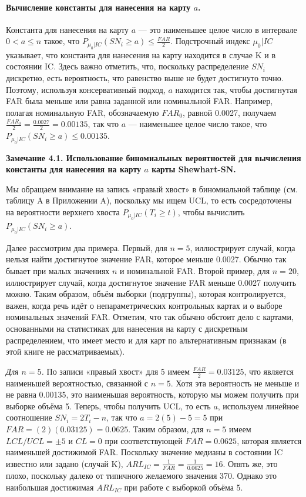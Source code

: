 \paragraph{Вычисление константы для нанесения на карту \(a\).} Константа для нанесения на карту \(a\) --- это наименьшее целое число в интервале \(0 < a \le n\) такое, что \(P_{\mu_0 | IC}(SN_i \ge a) \le \frac{FAR}{2}\). Подстрочный индекс \(\mu_0 | IC\) указывает, что константа для нанесения на карту находится в случае K и в состоянии IC. Здесь важно отметить, что, поскольку распределение \(SN_i\) дискретно, есть вероятность, что равенство выше не будет достигнуто точно. Поэтому, используя консервативный подход, \(a\) находится так, чтобы достигнутая FAR была меньше или равна заданной или номинальной FAR. Например, полагая номинальную FAR, обозначаемую \(FAR_0\), равной 0.0027, получаем \(\frac{FAR_0}{2} = \frac{0.0027}{2} = 0.00135\), так что \(a\) --- наименьшее целое число такое, что \(P_{\mu_0 | IC}(SN_i \ge a) \le 0.00135\).

\noindent\textbf{Замечание 4.1. Использование биномиальных вероятностей для вычисления константы для нанесения на карту \(a\) карты Shewhart-SN.}

Мы обращаем внимание на запись «правый хвост» в биномиальной таблице (см. таблицу A в Приложении A), поскольку мы ищем UCL, то есть сосредоточены на вероятности верхнего хвоста \(P_{\mu_0 | IC}(T_i \ge t)\), чтобы вычислить \(P_{\mu_0 | IC}(SN_i \ge a)\).

Далее рассмотрим два примера. Первый, для \(n = 5\), иллюстрирует случай, когда нельзя найти достигнутое значение FAR, которое меньше 0.0027. Обычно так бывает при малых значениях \(n\) и номинальной FAR. Второй пример, для \(n = 20\), иллюстрирует случай, когда достигнутое значение FAR меньше 0.0027 получить можно. Таким образом, объём выборки (подгруппы), которая контролируется, важен, когда речь идёт о непараметрических контрольных картах и о выборе номинальных значений FAR. Отметим, что так обычно обстоит дело с картами, основанными на статистиках для нанесения на карту с дискретным распределением, что имеет место и для карт по альтернативным признакам (в этой книге не рассматриваемых).

\emph{Для \(n = 5\).} По записи «правый хвост» для 5 имеем \(\frac{FAR}{2} = 0.03125\), что является наименьшей вероятностью, связанной с \(n = 5\). Хотя эта вероятность не меньше и не равна 0.00135, это наименьшая вероятность, которую мы можем получить при выборке объёма 5. Теперь, чтобы получить UCL, то есть \(a\), используем линейное соотношение \(SN_i = 2T_i - n\), так что \(a = 2(5) - 5 = 5\) при \(FAR = (2)(0.03125) = 0.0625\). Таким образом, для \(n = 5\) имеем \(LCL / UCL = \pm 5\) и \(CL = 0\) при соответствующей \(FAR = 0.0625\), которая является наименьшей достижимой FAR. Поскольку значение медианы в состоянии IC известно или задано (случай K), \(ARL_{IC} = \frac{1}{FAR} = \frac{1}{0.0625} = 16\). Опять же, это плохо, поскольку далеко от типичного желаемого значения 370. Однако это наибольшая достижимая \(ARL_{IC}\) при работе с выборкой объёма 5.


